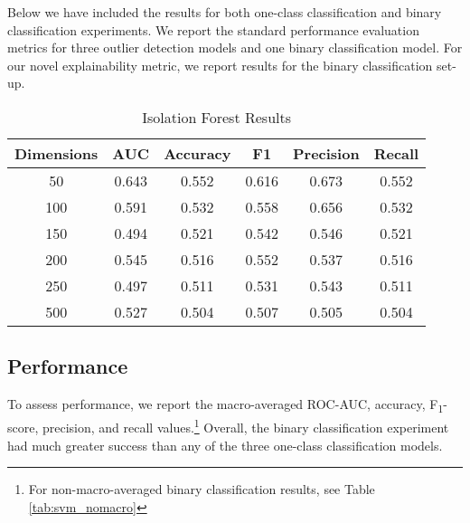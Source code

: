 \documentclass{article}
\begin{document}
\label{sec:results} Below we have included the results for both
one-class classification and binary classification experiments. We
report the standard performance evaluation metrics for three outlier
detection models and one binary classification model. For our novel
explainability metric, we report results for the binary classification
set-up.

\begin{table}
 \caption{Isolation Forest Results}
  \centering
  \begin{tabular}{|c|c|c|c|c|c|}
    \hline
    \rowcolor{lightgray} \textbf{Dimensions} & \textbf{AUC} & \textbf{Accuracy} & \textbf{F1} & \textbf{Precision} & \textbf{Recall} \\
    \hline
    \rowcolor{green} 50 & 0.643 & 0.552 & 0.616 & 0.673 & 0.552 \\
    \hline
    100 & 0.591 & 0.532 & 0.558 & 0.656 & 0.532 \\
    \hline
    150 & 0.494 & 0.521 & 0.542 & 0.546 & 0.521 \\
    \hline
    200 & 0.545 & 0.516 & 0.552 & 0.537 & 0.516 \\
    \hline
    250 & 0.497 & 0.511 & 0.531 & 0.543 & 0.511 \\
    \hline
    500 & 0.527 & 0.504 & 0.507 & 0.505 & 0.504 \\
    \hline
  \end{tabular}
  \label{tab:iforest}
\end{table}

\hypertarget{performance}{%
\subsection{Performance}\label{performance}}

To assess performance, we report the macro-averaged ROC-AUC, accuracy,
F\textsubscript{1}-score, precision, and recall values.\footnote{For
  non-macro-averaged binary classification results, see Table
  \ref{tab:svm_nomacro}} Overall, the binary classification experiment
had much greater success than any of the three one-class classification
models.
\end{document}
